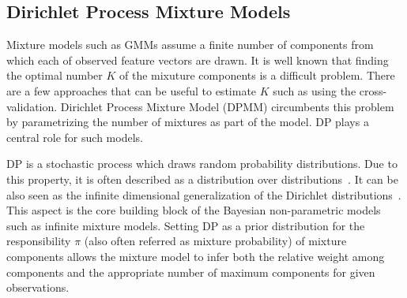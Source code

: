\documentclass{article}
\begin{document}
\subsection{Dirichlet Process Mixture Models}\label{sec:hdpgmm:dpmm}

Mixture models such as GMMs assume a finite number of components from which each of observed feature vectors are drawn. It is well known that finding the optimal number $K$ of the mixuture components is a difficult problem. There are a few approaches that can be useful to estimate $K$ such as using the cross-validation. Dirichlet Process Mixture Model (DPMM) circumbents this problem by parametrizing the number of mixtures as part of the model. DP plays a central role for such models.

DP is a stochastic process which draws random probability distributions. Due to this property, it is often described as a distribution over distributions~\cite{DBLP:reference/ml/Teh17}. It can be also seen as the infinite dimensional generalization of the Dirichlet distributions~\cite{DBLP:reference/ml/Teh17}.
This aspect is the core building block of the Bayesian non-parametric models such as infinite mixture models. Setting DP as a prior distribution for the responsibility $\pi$ (also often referred as mixture probability) of mixture components allows the mixture model to infer both the relative weight among components and the appropriate number of maximum components for given observations.
\end{document}
